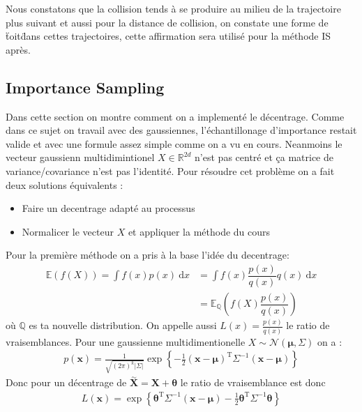\documentclass[a4paper, 12pt,twoside]{article}
\numberwithin{equation}{subsection}
\begin{document}
	Nous constatons que la collision tends à se produire au milieu de la trajectoire plus suivant et aussi pour la distance de collision, on constate une forme de \"toit\" dans cettes trajectoires, cette affirmation sera utilisé pour la méthode IS après.
	
	
	\subsection{Importance Sampling} %
	\label{sub:importance_sampling}
	
	Dans cette section on montre comment on a implementé le décentrage. Comme dans ce sujet on travail avec des gaussiennes, l'échantillonage d'importance restait valide et avec une formule assez simple comme on a vu en cours. Neanmoins le vecteur gaussienn multidimintionel $X\in \mathbb{R}^{2d}$ n'est pas centré et ça matrice de variance/covariance n'est pas l'identité. Pour résoudre cet problème on a fait deux solutions équivalents : 
	\begin{itemize}
		\item Faire un decentrage adapté au processus
		\item Normalicer le vecteur $X$ et appliquer la méthode du cours
	\end{itemize}
	Pour la première méthode on a pris à la base l'idée du decentrage:
	\begin{align}
		\mathbb{E}(f(X)) = \int f(x)p(x)~\mathrm{d}x &= \int f(x)\dfrac{p(x)}{q(x)}q(x)~\mathrm{d}x \nonumber \\
		&= \mathbb{E}_{\mathbb{Q}}(f(X)\dfrac{p(x)}{q(x)})
	\end{align}
	où $\mathbb{Q}$ es ta nouvelle distribution. On appelle aussi $L(x)=\frac{p(x)}{q(x)}$ le ratio de vraisemblances. Pour une gaussienne multidimentionelle $X \sim \mathcal{N}(\boldsymbol\mu, \Sigma)$ on a :
	\begin{align}
		p(\boldsymbol x) =
		\frac{1}{\sqrt{(2\pi)^{k}|\Sigma|}}
		\exp\left \{ -\frac{1}{2}({\mathbf x}-{\boldsymbol\mu})^\mathrm{T}{\Sigma}^{-1}({\mathbf x}-{\boldsymbol\mu})
		\right \}
	\end{align}
	Donc pour un décentrage de $\overset{\sim}{\boldsymbol X}=\boldsymbol X+ \boldsymbol \theta$ le ratio de vraisemblance est donc 
	\begin{align}
		L(\boldsymbol x) = \exp\left \{
		\boldsymbol\theta^\mathrm{T}{\Sigma}^{-1}({\mathbf x}-{\boldsymbol\mu})
		-\frac{1}{2}\boldsymbol\theta^\mathrm{T}{\Sigma}^{-1}\boldsymbol\theta
		\right \}
	\end{align}
	
\end{document}
